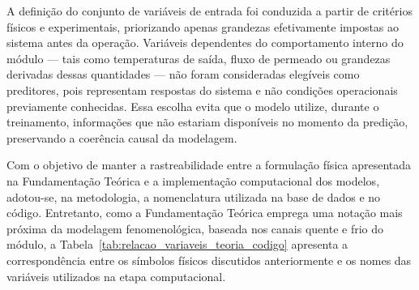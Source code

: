 A definição do conjunto de variáveis de entrada foi conduzida a partir de critérios físicos e experimentais, priorizando apenas grandezas efetivamente impostas ao sistema antes da operação. Variáveis dependentes do comportamento interno do módulo — tais como temperaturas de saída, fluxo de permeado ou grandezas derivadas dessas quantidades — não foram consideradas elegíveis como preditores, pois representam respostas do sistema e não condições operacionais previamente conhecidas. Essa escolha evita que o modelo utilize, durante o treinamento, informações que não estariam disponíveis no momento da predição, preservando a coerência causal da modelagem.


Com o objetivo de manter a rastreabilidade entre a formulação física apresentada na Fundamentação Teórica e a implementação computacional dos modelos, adotou-se, na metodologia, a nomenclatura utilizada na base de dados e no código. Entretanto, como a Fundamentação Teórica emprega uma notação mais próxima da modelagem fenomenológica, baseada nos canais quente e frio do módulo, a Tabela~\ref{tab:relacao_variaveis_teoria_codigo} apresenta a correspondência entre os símbolos físicos discutidos anteriormente e os nomes das variáveis utilizados na etapa computacional.

